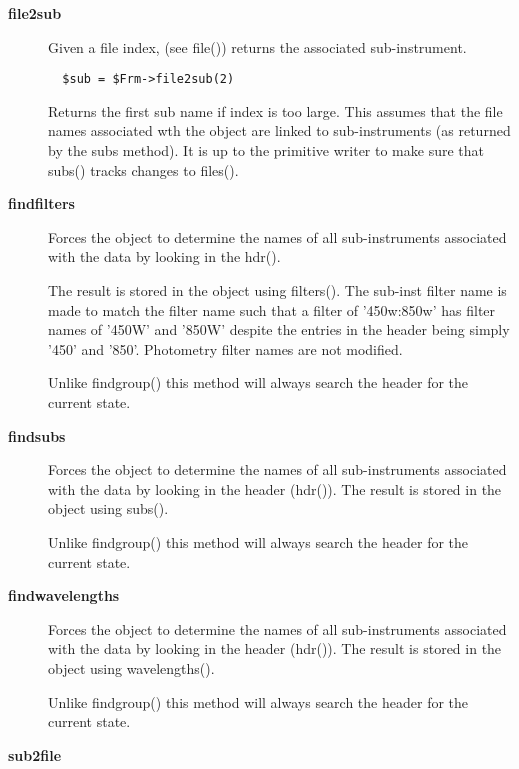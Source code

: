 \begin{description}
\item[\textbf{file2sub}] \mbox{}

Given a file index, (see file()) returns the associated
sub-instrument.

\begin{verbatim}
  $sub = $Frm->file2sub(2)
\end{verbatim}


Returns the first sub name if index is too large.
This assumes that the file names associated wth the
object are linked to sub-instruments (as returned
by the subs method). It is up to the primitive writer
to make sure that subs() tracks changes to files().

\item[\textbf{findfilters}] \mbox{}

Forces the object to determine the names of all sub-instruments
associated with the data by looking in the hdr().



The result is stored in the object using filters(). The sub-inst filter
name is made to match the filter name such that a filter of '450w:850w'
has filter names of '450W' and '850W' despite the entries in the header
being simply '450' and '850'. Photometry filter names are not modified.



Unlike findgroup() this method will always search the header for
the current state.

\item[\textbf{findsubs}] \mbox{}

Forces the object to determine the names of all sub-instruments
associated with the data by looking in the header (hdr()). 
The result is stored in the object using subs().



Unlike findgroup() this method will always search the header for
the current state.

\item[\textbf{findwavelengths}] \mbox{}

Forces the object to determine the names of all sub-instruments
associated with the data by looking in the header (hdr()). 
The result is stored in the object using wavelengths().



Unlike findgroup() this method will always search the header for
the current state.

\item[\textbf{sub2file}] \mbox{}


\end{description}
